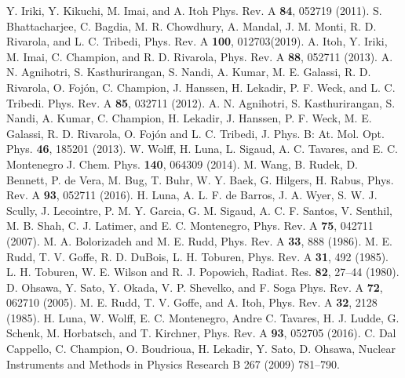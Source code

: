 \documentclass[10pt,showpacs,showkeys,twocolumn]{revtex4-1}
\begin{document}
\begin{thebibliography}{}
Y. Iriki, Y. Kikuchi, M. Imai, and A. Itoh
Phys. Rev. A \textbf{84}, 052719 (2011). 
S. Bhattacharjee, C. Bagdia, M. R. Chowdhury, A. Mandal, J. M. Monti, 
R. D. Rivarola, and L. C. Tribedi, 
Phys. Rev. A \textbf{100}, 012703(2019).
A. Itoh, Y. Iriki, M. Imai, C. Champion, and R. D. Rivarola, 
Phys. Rev. A \textbf{88}, 052711 (2013).
A. N. Agnihotri, S. Kasthurirangan, S. Nandi, A. Kumar, M. E. Galassi, 
R. D. Rivarola, O. Foj\'on, C. Champion, J. Hanssen, H. Lekadir, 
P. F. Weck, and L. C. Tribedi. 
Phys. Rev. A \textbf{85}, 032711 (2012).
A. N. Agnihotri, S. Kasthurirangan, S. Nandi, A. Kumar, C. Champion, 
H. Lekadir, J. Hanssen, P. F. Weck, M. E. Galassi, R. D. Rivarola, 
O. Foj\'on and L. C. Tribedi, 
J. Phys. B: At. Mol. Opt. Phys. \textbf{46}, 185201 (2013).
W. Wolff, H. Luna, L. Sigaud, A. C. Tavares, and E. C. Montenegro
J. Chem. Phys. \textbf{140}, 064309 (2014).
M. Wang, B. Rudek, D. Bennett, P. de Vera, M. Bug, T. Buhr, W. Y. Baek,
G. Hilgers, H. Rabus, 
Phys. Rev. A \textbf{93}, 052711 (2016).
H. Luna, A. L. F. de Barros, J. A. Wyer, S. W. J. Scully, J. Lecointre, 
P. M. Y. Garcia, G. M. Sigaud, A. C. F. Santos, V. Senthil, M. B. Shah, 
C. J. Latimer, and E. C. Montenegro,
Phys. Rev. A \textbf{75}, 042711 (2007).
M. A. Bolorizadeh and M. E. Rudd, 
Phys. Rev. A \textbf{33}, 888 (1986). 
M. E. Rudd, T. V. Goffe, R. D. DuBois, L. H. Toburen, 
Phys. Rev. A \textbf{31}, 492 (1985). 
L. H. Toburen, W. E. Wilson and R. J. Popowich,
Radiat. Res. \textbf{82}, 27--44 (1980).
D. Ohsawa, Y. Sato, Y. Okada, V. P. Shevelko, and F. Soga
Phys. Rev. A \textbf{72}, 062710 (2005).
M. E. Rudd, T. V. Goffe, and A. Itoh, 
Phys. Rev. A \textbf{32}, 2128 (1985).
H. Luna, W. Wolff, E. C. Montenegro, Andre C. Tavares, H. J. Ludde, 
G. Schenk, M. Horbatsch, and T. Kirchner, 
Phys. Rev. A \textbf{93}, 052705 (2016).  
C. Dal Cappello, C. Champion, O. Boudrioua, H. Lekadir, Y. Sato, 
D. Ohsawa, 
Nuclear Instruments and Methods in Physics Research B 267 (2009) 781--790.

\end{thebibliography}
\end{document}
